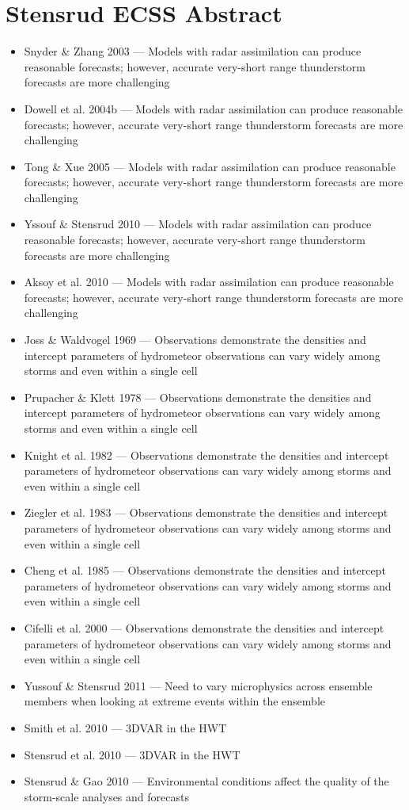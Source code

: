 \documentclass{article}
\begin{document}
\section{Stensrud ECSS Abstract}
    \begin{itemize}
        \item Snyder \& Zhang 2003 --- Models with radar assimilation can produce reasonable forecasts; however, accurate very-short range thunderstorm forecasts are more challenging
        \item Dowell et al. 2004b --- Models with radar assimilation can produce reasonable forecasts; however, accurate very-short range thunderstorm forecasts are more challenging
        \item Tong \& Xue 2005 --- Models with radar assimilation can produce reasonable forecasts; however, accurate very-short range thunderstorm forecasts are more challenging
        \item Yssouf \& Stensrud 2010 --- Models with radar assimilation can produce reasonable forecasts; however, accurate very-short range thunderstorm forecasts are more challenging
        \item Aksoy et al. 2010 --- Models with radar assimilation can produce reasonable forecasts; however, accurate very-short range thunderstorm forecasts are more challenging
        \item Joss \& Waldvogel 1969 --- Observations demonstrate the densities and intercept parameters of hydrometeor observations can vary widely among storms and even within a single cell
        \item Prupacher \& Klett 1978 --- Observations demonstrate the densities and intercept parameters of hydrometeor observations can vary widely among storms and even within a single cell
        \item Knight et al. 1982 --- Observations demonstrate the densities and intercept parameters of hydrometeor observations can vary widely among storms and even within a single cell
        \item Ziegler et al. 1983 --- Observations demonstrate the densities and intercept parameters of hydrometeor observations can vary widely among storms and even within a single cell
        \item Cheng et al. 1985 --- Observations demonstrate the densities and intercept parameters of hydrometeor observations can vary widely among storms and even within a single cell
        \item Cifelli et al. 2000 --- Observations demonstrate the densities and intercept parameters of hydrometeor observations can vary widely among storms and even within a single cell
        \item Yussouf \& Stensrud 2011 --- Need to vary microphysics across ensemble members when looking at extreme events within the ensemble
        \item Smith et al. 2010 --- 3DVAR in the HWT
        \item Stensrud et al. 2010 --- 3DVAR in the HWT
        \item Stensrud \& Gao 2010 --- Environmental conditions affect the quality of the storm-scale analyses and forecasts

    \end{itemize}
\end{document}
